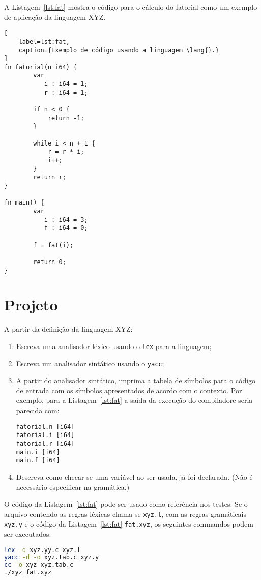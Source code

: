 \documentclass{article}
\def\lang{{\sc XYZ}}
\begin{document}
\pagebreak
A Listagem~\ref{lst:fat} mostra o código para o cálculo 
do fatorial como um exemplo de aplicação da linguagem 
\lang.

\begin{lstlisting}[
    label=lst:fat,
    caption={Exemplo de código usando a linguagem \lang{}.}
]
fn fatorial(n i64) {
        var
           i : i64 = 1;
           r : i64 = 1;
    
        if n < 0 {
            return -1;
        }

        while i < n + 1 {
            r = r * i;
            i++;
        }
        return r;
}
    
fn main() {
        var 
           i : i64 = 3;
           f : i64 = 0;
    
        f = fat(i);

        return 0;
}
\end{lstlisting}

\section*{Projeto}

A partir da definição da linguagem \lang:

\begin{enumerate}
\item Escreva uma analisador léxico usando o {\tt lex} 
para a linguagem;
\item Escreva um analisador sintático usando o {\tt yacc};
\item A partir do analisador sintático, imprima a tabela de 
símbolos para o código de entrada com os símbolos apresentados 
de acordo com o contexto. Por exemplo, para a Listagem~\ref{lst:fat}
a saída da execução do compiladore seria parecida com:

\begin{verbatim}
fatorial.n [i64]
fatorial.i [i64]
fatorial.r [i64]
main.i [i64]
main.f [i64]
\end{verbatim}

\item Descreva como checar se uma variável ao ser usada, já foi
  declarada. (Não é necessário especificar na gramática.)
\end{enumerate}

O código da Listagem~\ref{lst:fat} pode ser usado como referência
nos testes. Se o arquivo contendo as regras léxicas chama-se 
{\tt xyz.l}, com as regras gramáticais {\tt xyz.y} e o 
código da Listagem~\ref{lst:fat} {\tt fat.xyz}, os seguintes 
commandos podem ser executados:

\begin{lstlisting}[language=bash]
lex -o xyz.yy.c xyz.l
yacc -d -o xyz.tab.c xyz.y
cc -o xyz xyz.tab.c
./xyz fat.xyz
\end{lstlisting}
\end{document}

